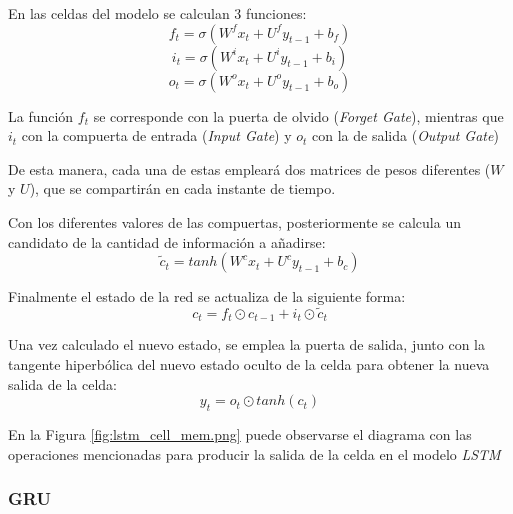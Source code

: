 En las celdas del modelo se calculan 3 funciones:
\begin{equation}
    f_t = \sigma (W^{f} x_t + U^{f} y_{t-1} + b_f)
\end{equation}
\begin{equation}
    i_t = \sigma (W^{i} x_t + U^{i} y_{t-1} + b_i)
\end{equation}
\begin{equation}    
    o_t = \sigma (W^{o} x_t + U^{o} y_{t-1} + b_o)
\end{equation}

La función \(f_t\) se corresponde con la puerta de olvido (\textit{Forget Gate}), mientras que 
\(i_t\) con la compuerta de entrada (\textit{Input Gate}) y \(o_t\) con la de salida (\textit{Output
Gate})

De esta manera, cada una de estas empleará dos matrices de pesos diferentes (\(W\) y \(U\)), que se compartirán
en cada instante de tiempo.

Con los diferentes valores de las compuertas, posteriormente se calcula un candidato de la cantidad de información
a añadirse:
\begin{equation}
    \widetilde{c}_t = tanh (W^{c} x_t + U^{c} y_{t-1} + b_c) 
\end{equation}

Finalmente el estado de la red se actualiza de la siguiente forma:
\begin{equation}
    c_t = f_t \odot  c_{t-1} + i_{t} \odot \widetilde{c}_t 
\end{equation}

Una vez calculado el nuevo estado, se emplea la puerta de salida, junto con la tangente hiperbólica
del nuevo estado oculto de la celda para obtener la nueva salida de la celda:
\begin{equation}
    y_t =  o_t \odot tanh(c_t)
\end{equation}

En la Figura \ref{fig:lstm_cell_mem.png} puede observarse el diagrama con las operaciones mencionadas
para producir la salida de la celda en el modelo \textit{LSTM}

\subsubsection{GRU}

